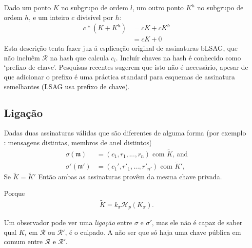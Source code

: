 \begin{description}
Dado um ponto $K$ no subgrupo de ordem $l$, um outro ponto $K^h$ no subgrupo de ordem $h$, e um inteiro $c$ divisível por $h$:
\begin{align*}
    c*(K + K^h) &= cK + cK^h\\
                &= cK + 0
\end{align*}
Esta descrição tenta fazer juz á esplicação original de assinaturas bLSAG, que não incluêm $\mathcal{R}$ na hash que calcula $c_i$. Incluír chaves na hash é conhecido como `prefixo de chave'. Pesquisas recentes sugerem que isto não é necessário, apesar de que adicionar o prefixo é uma práctica standard para esquemas de assinatura semelhantes (LSAG usa prefixo de chave).

\subsection*{Ligação}

Dadas duas assinaturas válidas que são diferentes de alguma forma (por exemplo : mensagens distintas, membros de anel distintos)
\vspace{.1cm}
\begin{align*}
	\sigma(\mathfrak{m})   &= (c_1, r_1, ..., r_n)\textrm{ com } \tilde{K}\textrm{, and}\\
	\sigma'(\mathfrak{m}')  &= (c_1', r'_1, ..., r'_{n'})\textrm{ com } \tilde{K}'\textrm{,}
\end{align*}
\quad Se \(\tilde{K} =  \tilde{K}'\) Então ambas as assinaturas provêm da mesma chave privada. 

Porque 
\begin{align*}
\tilde{K}= k_{\pi} \mathcal{H}_p(K_\pi).
\end{align*}

Um observador pode ver uma {\em ligação} entre $\sigma$ e $\sigma'$, mas ele não é capaz de saber qual $K_i$ em $\mathcal{R}$ ou $\mathcal{R}'$, é o culpado. 
A não ser que só haja uma chave pública em comum entre $\mathcal{R}$ e $\mathcal{R}'$.
   

\end{description}
